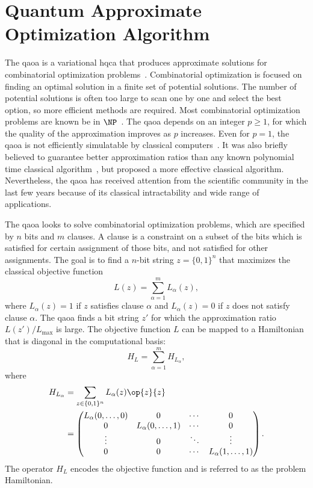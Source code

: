 \section{Quantum Approximate Optimization Algorithm}
The \gls{qaoa} is a variational \gls{hqca} that produces approximate solutions for combinatorial optimization problems~\cite{farhi2014quantum}.
Combinatorial optimization is focused on finding an optimal solution in a finite set of potential solutions.
The number of potential solutions is often too large to scan one by one and select the best option, so more efficient methods are required.
Most combinatorial optimization problems are known be in $\NP$~\cite{schrijver2003combinatorial}.
The \gls{qaoa} depends on an integer $p \ge 1$, for which the quality of the approximation improves as $p$ increases.
Even for $p = 1$, the \gls{qaoa} is not efficiently simulatable by classical computers~\cite{farhi2016quantum}.
It was also briefly believed to guarantee better approximation ratios than any known polynomial time classical algorithm~\cite{farhi2014quantum}, but \textcite{barak2015beating} proposed a more effective classical algorithm.
Nevertheless, the \gls{qaoa} has received attention from the scientific community in the last few years because of its classical intractability and wide range of applications.

The \gls{qaoa} looks to solve combinatorial optimization problems, which are specified by $n$ bits and $m$ clauses.
A clause is a constraint on a subset of the bits which is satisfied for certain assignment of those bits, and not satisfied for other assignments.
The goal is to find a $n$-bit string $z = \{0,1\}^n$ that maximizes the classical objective function
\begin{equation} \label{eqn:objective-function}
L(z) = \sum_{\alpha=1}^m L_\alpha(z),
\end{equation}
where $L_\alpha(z) = 1$ if $z$ satisfies clause $\alpha$ and $L_\alpha(z) = 0$ if $z$ does not satisfy clause $\alpha$.
The \gls{qaoa} finds a bit string $z'$ for which the approximation ratio $L(z')/L_{\text{max}}$ is large.
The objective function $L$ can be mapped to a Hamiltonian that is diagonal in the computational basis:
\begin{equation}
H_L = \sum_{\alpha=1}^m H_{L_\alpha},
\end{equation}
where
\begin{align}
H_{L_\alpha} &= \sum_{z \in \{0, 1\}^n} L_\alpha(z) \op{z}{z} \\
&=
\begin{pmatrix}
L_\alpha(0,\ldots,0) & 0 & \cdots & 0 \\
0 & L_\alpha(0,\ldots,1) & \cdots & 0 \\
\vdots & 0 & \ddots & \vdots \\
0 & 0 & \cdots & L_\alpha(1,\ldots,1)
\end{pmatrix}.
\end{align}
The operator $H_L$ encodes the objective function and is referred to as the problem Hamiltonian.

